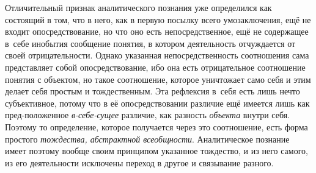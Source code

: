 Отличительный признак аналитического познания уже определился
как состоящий в том, что в него, как в первую посылку всего умозаключения,
ещё не входит опосредствование, но что оно есть непосредственное, ещё не
содержащее в~себе инобытия сообщение понятия, в котором деятельность
отчуждается от своей отрицательности. Однако указанная непосредственность
соотношения сама представляет собой опосредствование, ибо она есть
отрицательное соотношение понятия с объектом, но такое соотношение, которое
уничтожает само себя и этим делает себя простым и тождественным. Эта
рефлексия в~себя есть лишь нечто субъективное, потому что в её
опосредствовании различие ещё имеется лишь как пред-положенное
{\em в-себе-сущее}
различие, как разность
{\em объекта} внутри
себя. Поэтому то определение, которое получается через это соотношение,
есть форма простого {\em тождества,
абстрактной всеобщности}. Аналитическое познание имеет
поэтому вообще своим принципом указанное тождество, и из него самого, из
его деятельности исключены переход в другое и связывание разного.

